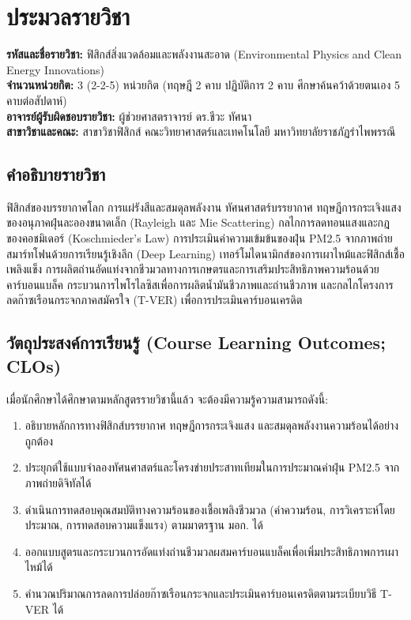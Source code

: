 \chapter*{ประมวลรายวิชา}

\noindent\textbf{รหัสและชื่อรายวิชา:} ฟิสิกส์สิ่งแวดล้อมและพลังงานสะอาด (Environmental Physics and Clean Energy Innovations)\\[0.2cm]
\noindent\textbf{จำนวนหน่วยกิต:} 3 (2-2-5) หน่วยกิต (ทฤษฎี 2 คาบ ปฏิบัติการ 2 คาบ ศึกษาค้นคว้าด้วยตนเอง 5 คาบต่อสัปดาห์)\\[0.2cm]
\noindent\textbf{อาจารย์ผู้รับผิดชอบรายวิชา:} ผู้ช่วยศาสตราจารย์ ดร.ชีวะ ทัศนา\\[0.2cm]
\noindent\textbf{สาขาวิชาและคณะ:} สาขาวิชาฟิสิกส์ คณะวิทยาศาสตร์และเทคโนโลยี มหาวิทยาลัยราชภัฏรำไพพรรณี

\section*{คำอธิบายรายวิชา}
ฟิสิกส์ของบรรยากาศโลก การแผ่รังสีและสมดุลพลังงาน ทัศนศาสตร์บรรยากาศ ทฤษฎีการกระเจิงแสงของอนุภาคฝุ่นละอองขนาดเล็ก (Rayleigh และ Mie Scattering) กลไกการลดทอนแสงและกฎของคอชมิเดอร์ (Koschmieder's Law) การประเมินค่าความเข้มข้นของฝุ่น PM2.5 จากภาพถ่ายสมาร์ทโฟนด้วยการเรียนรู้เชิงลึก (Deep Learning) เทอร์โมไดนามิกส์ของการเผาไหม้และฟิสิกส์เชื้อเพลิงแข็ง การผลิตถ่านอัดแท่งจากชีวมวลทางการเกษตรและการเสริมประสิทธิภาพความร้อนด้วยคาร์บอนแบล็ค กระบวนการไพโรไลซิสเพื่อการผลิตน้ำมันชีวภาพและถ่านชีวภาพ และกลไกโครงการลดก๊าซเรือนกระจกภาคสมัครใจ (T-VER) เพื่อการประเมินคาร์บอนเครดิต

\section*{วัตถุประสงค์การเรียนรู้ (Course Learning Outcomes; CLOs)}
เมื่อนักศึกษาได้ศึกษาตามหลักสูตรรายวิชานี้แล้ว จะต้องมีความรู้ความสามารถดังนี้:
\begin{enumerate}
    \item อธิบายหลักการทางฟิสิกส์บรรยากาศ ทฤษฎีการกระเจิงแสง และสมดุลพลังงานความร้อนได้อย่างถูกต้อง
    \item ประยุกต์ใช้แบบจำลองทัศนศาสตร์และโครงข่ายประสาทเทียมในการประมาณค่าฝุ่น PM2.5 จากภาพถ่ายดิจิทัลได้
    \item ดำเนินการทดสอบคุณสมบัติทางความร้อนของเชื้อเพลิงชีวมวล (ค่าความร้อน, การวิเคราะห์โดยประมาณ, การทดสอบความแข็งแรง) ตามมาตรฐาน มอก. ได้
    \item ออกแบบสูตรและกระบวนการอัดแท่งถ่านชีวมวลผสมคาร์บอนแบล็คเพื่อเพิ่มประสิทธิภาพการเผาไหม้ได้
    \item คำนวณปริมาณการลดการปล่อยก๊าซเรือนกระจกและประเมินคาร์บอนเครดิตตามระเบียบวิธี T-VER ได้
\end{enumerate}

